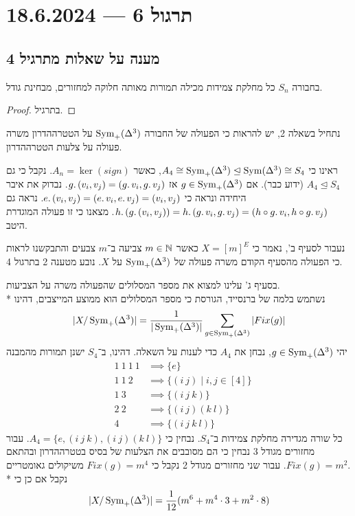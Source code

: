 \section{תרגול 6 --- 18.6.2024}
\subsection{מענה על שאלות מתרגיל 4}
\begin{proposition}
	בחבורה $S_n$ כל מחלקת צמידות מכילה תמורות מאותה חלוקה למחזורים, מבחינת גודל.
\end{proposition}
\begin{proof}
	בתרגיל.
\end{proof}
נתחיל בשאלה 2, יש להראות כי הפעולה של החבורה $\operatorname{Sym}_+(\Delta^3)$ על הטטרההדרון משרה פעולה על צלעות הטטרההדרון.

ראינו כי $A_4 \cong \operatorname{Sym}_+(\Delta^3) \trianglelefteq \operatorname{Sym}(\Delta^3) \cong S_4$, כאשר $A_n = \ker(sign)$. נקבל כי גם $A_4 \trianglelefteq S_4$ (ידוע כבר).
אם $g \in \operatorname{Sym}_+(\Delta^3)$ אז $g \ldotp (v_i, v_j) = (g \ldotp v_i, g \ldotp v_j)$.
נבדוק את איבר היחידה ונראה כי $e \ldotp (v_i, v_j) = (e \ldotp v_i, e \ldotp v_j) = (v_i, v_j)$.
נראה גם $h \ldotp (g \ldotp (v_i, v_j)) = h \ldotp (g \ldotp v_i, g \ldotp v_j) = (h \circ g \ldotp v_i, h \circ g \ldotp v_j)$.
מצאנו כי זו פעולה המוגדרת היטב.

נעבור לסעיף ב', נאמר כי $X = {[m]}^E$ כאשר $m \in \mathbb{N}$ צביעה ב־$m$ צבעים והתבקשנו לראות כי הפעולה מהסעיף הקודם משרה פעולה של $\operatorname{Sym}_+(\Delta^3)$ על $X$.
נובע מטענה 2 בתרגול 4.

בסעיף ג' עלינו למצוא את מספר המסלולים שהפעולה משרה על הצביעות. \\*
נשתמש בלמה של ברנסייד, הגורסת כי מספר המסלולים הוא ממוצע המייצבים, דהינו
\[
	|X/\operatorname{Sym}_+(\Delta^3)| = \frac{1}{|\operatorname{Sym}_+(\Delta^3)|} \sum_{g \in \operatorname{Sym}_+(\Delta^3)} |Fix(g)|
\]
יהי $g \in \operatorname{Sym}_+(\Delta^3)$, נבחן את $A_4$ כדי לענות על השאלה.
דהינו, ב־$S_4$ ישנן תמורות מהמבנה
\begin{align*}
	& 1\ 1\ 1\ 1
	& \implies \{ e \} \\
	& 1\ 1\ 2 
	& \implies \{(i\ j) \mid i, j \in [4]\} \\
	& 1\ 3 & \implies \{ (i\ j\ k) \} \\
	& 2\ 2 & \implies \{ (i\ j)(k\ l) \} \\
	& 4 & \implies \{ (i\ j\ k\ l) \}
\end{align*}
כל שורה מגדירה מחלקת צמידות ב־$S_4$.
נבחין כי $A_4 = \{ e, (i\ j\ k), (i\ j)(k\ l) \}$.
עבור מחזורים מגודל 3 נבחין כי הם מסובבים את הצלעות של בסיס בטטרההדרון ובהתאם $Fix(g) = m^2$. עבור שני מחזורים מגודל 2 נקבל כי $Fix(g) = m^4$ משיקולים גאומטריים. \\*
נקבל אם כן כי
\[
	|X/\operatorname{Sym}_+(\Delta^3)| = \frac{1}{12}(m^6 + m^4 \cdot 3 + m^2 \cdot 8)
\]

